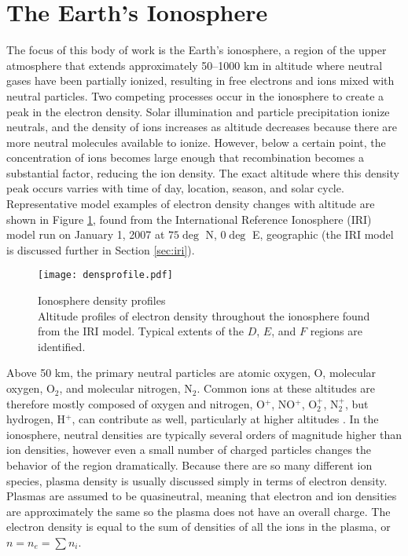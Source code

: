 \section{The Earth's Ionosphere}
\label{sec:ionosphere}
The focus of this body of work is the Earth's ionosphere, a region of the upper atmosphere that extends approximately 50--1000 km in altitude where neutral gases have been partially ionized, resulting in free electrons and ions mixed with neutral particles.  Two competing processes occur in the ionosphere to create a peak in the electron density.  Solar illumination and particle precipitation ionize neutrals, and the density of ions increases as altitude decreases because there are more neutral molecules available to ionize.  However, below a certain point, the concentration of ions becomes large enough that recombination becomes a substantial factor, reducing the ion density.  The exact altitude where this density peak occurs varries with time of day, location, season, and solar cycle.  Representative model examples of electron density changes with altitude are shown in Figure \ref{fig:densprofile}, found from the International Reference Ionosphere (IRI) model run on January 1, 2007 at \(75\deg\) N, \(0\deg\) E, geographic (the IRI model is discussed further in Section \ref{sec:iri}).

\begin{figure}
	\centering
	\texttt{[image: densprofile.pdf]}
	\caption[Ionosphere density profiles]{{\:}Ionosphere density profiles\\ Altitude profiles of electron density throughout the ionosphere found from the IRI model.  Typical extents of the \(D\), \(E\), and \(F\) regions are identified.}
	\label{fig:densprofile}
\end{figure}

Above 50 km, the primary neutral particles are atomic oxygen, O, molecular oxygen, O\(_2\), and molecular nitrogen, N\(_2\).  Common ions at these altitudes are therefore mostly composed of oxygen and nitrogen, O\(^+\), NO\(^+\), O\(_2^+\), N\(_2^+\), but hydrogen, H\(^+\), can contribute as well, particularly at higher altitudes \citep{Kelley2009}.  In the ionosphere, neutral densities are typically several orders of magnitude higher than ion densities, however even a small number of charged particles changes the behavior of the region dramatically.  Because there are so many different ion species, plasma density is usually discussed simply in terms of electron density.  Plasmas are assumed to be quasineutral, meaning that electron and ion densities are approximately the same so the plasma does not have an overall charge.  The electron density is equal to the sum of densities of all the ions in the plasma, or \(n = n_e = \sum n_i\).

